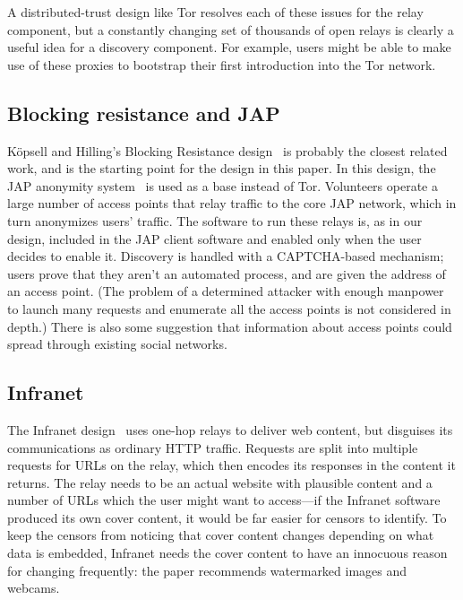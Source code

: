 \documentclass{llncs}
\begin{document}
A distributed-trust design like Tor resolves each of these issues for
the relay component, but a constantly changing set of thousands of open
relays is clearly a useful idea for a discovery component. For example,
users might be able to make use of these proxies to bootstrap their
first introduction into the Tor network.

\subsection{Blocking resistance and JAP}

K\"{o}psell and Hilling's Blocking Resistance
design~\cite{koepsell:wpes2004} is probably
the closest related work, and is the starting point for the design in this
paper.  In this design, the JAP anonymity system~\cite{web-mix} is used
as a base instead of Tor.  Volunteers operate a large number of access
points that relay traffic to the core JAP
network, which in turn anonymizes users' traffic.  The software to run these
relays is, as in our design, included in the JAP client software and enabled
only when the user decides to enable it.  Discovery is handled with a
CAPTCHA-based mechanism; users prove that they aren't an automated process,
and are given the address of an access point.  (The problem of a determined
attacker with enough manpower to launch many requests and enumerate all the
access points is not considered in depth.)  There is also some suggestion
that information about access points could spread through existing social
networks.

\subsection{Infranet}

The Infranet design~\cite{infranet} uses one-hop relays to deliver web
content, but disguises its communications as ordinary HTTP traffic.  Requests
are split into multiple requests for URLs on the relay, which then encodes
its responses in the content it returns.  The relay needs to be an actual
website with plausible content and a number of URLs which the user might want
to access---if the Infranet software produced its own cover content, it would
be far easier for censors to identify.  To keep the censors from noticing
that cover content changes depending on what data is embedded, Infranet needs
the cover content to have an innocuous reason for changing frequently: the
paper recommends watermarked images and webcams.
\end{document}
